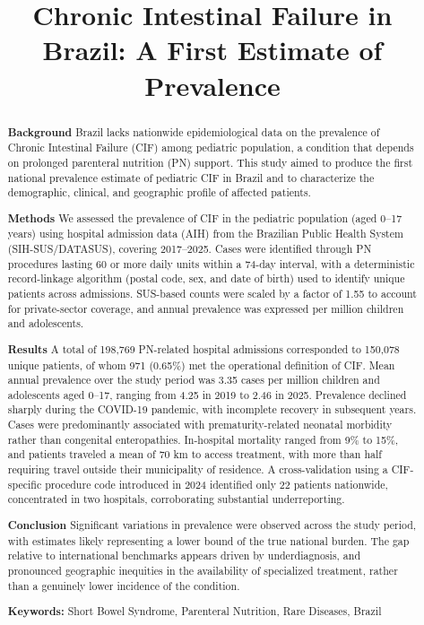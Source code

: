 \documentclass[12pt,a4paper]{article}
\title{Chronic Intestinal Failure in Brazil: A First Estimate of Prevalence}
\author{}
\date{}
\theoremstyle{plain}
\theoremstyle{definition}
\theoremstyle{remark}
\begin{document}
\maketitle

\renewcommand{\thefootnote}{\arabic{footnote}}

\begin{abstract}
\noindent\textbf{Background} Brazil lacks nationwide epidemiological data on the prevalence of Chronic Intestinal Failure (CIF) among pediatric population, a condition that depends on prolonged parenteral nutrition (PN) support. This study aimed to produce the first national prevalence estimate of pediatric CIF in Brazil and to characterize the demographic, clinical, and geographic profile of affected patients.

\noindent\textbf{Methods} We assessed the prevalence of CIF in the pediatric population (aged 0--17 years) using hospital admission data (AIH) from the Brazilian Public Health System (SIH-SUS\slash DATASUS), covering 2017--2025. Cases were identified through PN procedures lasting 60 or more daily units within a 74-day interval, with a deterministic record-linkage algorithm (postal code, sex, and date of birth) used to identify unique patients across admissions. SUS-based counts were scaled by a factor of 1.55 to account for private-sector coverage, and annual prevalence was expressed per million children and adolescents.

\noindent\textbf{Results} A total of 198,769 PN-related hospital admissions corresponded to 150,078 unique patients, of whom 971 (0.65\%) met the operational definition of CIF. Mean annual prevalence over the study period was 3.35 cases per million children and adolescents aged 0--17, ranging from 4.25 in 2019 to 2.46 in 2025. Prevalence declined sharply during the COVID-19 pandemic, with incomplete recovery in subsequent years. Cases were predominantly associated with prematurity-related neonatal morbidity rather than congenital enteropathies. In-hospital mortality ranged from 9\% to 15\%, and patients traveled a mean of 70 km to access treatment, with more than half requiring travel outside their municipality of residence. A cross-validation using a CIF-specific procedure code introduced in 2024 identified only 22 patients nationwide, concentrated in two hospitals, corroborating substantial underreporting.

\noindent\textbf{Conclusion} Significant variations in prevalence were observed across the study period, with estimates likely representing a lower bound of the true national burden. The gap relative to international benchmarks appears driven by underdiagnosis, and pronounced geographic inequities in the availability of specialized treatment, rather than a genuinely lower incidence of the condition.

\medskip
\noindent\textbf{Keywords:} Short Bowel Syndrome, Parenteral Nutrition, Rare Diseases, Brazil
\end{abstract}
\end{document}
